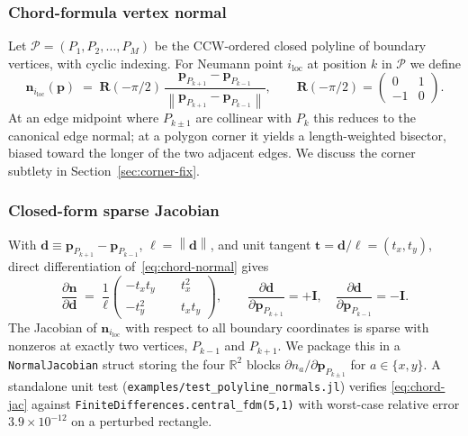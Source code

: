 \documentclass[11pt,a4paper]{article}
\newcommand{\mat}[1]{\mathbf{#1}}
\newcommand{\vect}[1]{\boldsymbol{#1}}
\newcommand{\pts}{\vect{p}}
\newcommand{\norm}[1]{\left\lVert#1\right\rVert}
\newcommand{\reals}{\mathbb{R}}
\begin{document}
\subsubsection{Chord-formula vertex normal}

Let $\mathcal P = (P_1, P_2, \ldots, P_M)$ be the CCW-ordered closed
polyline of boundary vertices, with cyclic indexing. For Neumann
point $i_{\text{loc}}$ at position $k$ in $\mathcal P$ we define
\begin{equation}
  \vect n_{i_{\text{loc}}}(\pts)
  \;=\;
  \mat R(-\pi/2)\,
  \frac{\pts_{P_{k+1}} - \pts_{P_{k-1}}}{\norm{\pts_{P_{k+1}} - \pts_{P_{k-1}}}},
  \qquad
  \mat R(-\pi/2) = \begin{pmatrix} 0 & 1 \\ -1 & 0 \end{pmatrix}.
  \label{eq:chord-normal}
\end{equation}
At an edge midpoint where $P_{k\pm 1}$ are collinear with $P_k$
this reduces to the canonical edge normal; at a polygon corner it
yields a length-weighted bisector, biased toward the longer of the
two adjacent edges. We discuss the corner subtlety in
Section~\ref{sec:corner-fix}.

\subsubsection{Closed-form sparse Jacobian}

With $\vect d \equiv \pts_{P_{k+1}}-\pts_{P_{k-1}}$,
$\ell = \norm{\vect d}$, and unit tangent
$\vect t = \vect d/\ell = (t_x, t_y)$, direct differentiation
of~\eqref{eq:chord-normal} gives
\begin{equation}
  \frac{\partial\vect n}{\partial\vect d}
  \;=\;
  \frac{1}{\ell}
  \begin{pmatrix}
    -t_x t_y & \phantom{-}t_x^2 \\
    -t_y^2  & \phantom{-}t_x t_y
  \end{pmatrix},
  \qquad
  \frac{\partial\vect d}{\partial \pts_{P_{k+1}}} = +\mat I, \quad
  \frac{\partial\vect d}{\partial \pts_{P_{k-1}}} = -\mat I.
  \label{eq:chord-jac}
\end{equation}
The Jacobian of $\vect n_{i_{\text{loc}}}$ with respect to all
boundary coordinates is sparse with nonzeros at exactly two
vertices, $P_{k-1}$ and $P_{k+1}$. We package this in a
\texttt{NormalJacobian} struct storing the four $\reals^2$ blocks
$\partial n_a/\partial \pts_{P_{k\pm 1}}$ for $a \in \{x, y\}$.
A standalone unit test
(\texttt{examples/test\_polyline\_normals.jl}) verifies
\eqref{eq:chord-jac} against \texttt{FiniteDifferences.central\_fdm(5,1)}
with worst-case relative error $3.9\times 10^{-12}$ on a perturbed
rectangle.
\end{document}
